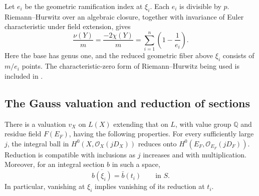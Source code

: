 Let $e_i$ be the geometric ramification index at $\xi_i$. Each $e_i$ is
divisible by $p$. Riemann--Hurwitz over an algebraic closure, together
with invariance of Euler characteristic under field extension, gives
\begin{equation}\label{eq:generic-hurwitz}
 \frac{\nu(Y)}m
 =\frac{-2\chi(Y)}m
 =\sum_{i=1}^n\left(1-\frac1{e_i}\right).
\end{equation}
Here the base has genus one, and the reduced geometric fiber above
$\xi_i$ consists of $m/e_i$ points. The characteristic-zero form of
Riemann--Hurwitz being used is included in .

\subsection{The Gauss valuation and reduction of sections}

\begin{lemma}\label{lem:gauss-section-rule}
There is a valuation $v_X$ on $L(X)$ extending that on $L$, with value
group $\mathbb Q$ and residue field $F(E_F)$, having the following
properties. For every sufficiently large $j$, the integral ball in
$H^0(X,\mathcal O_X(jD_X))$ reduces onto
$H^0(E_F,\mathcal O_{E_F}(jD_F))$. Reduction is compatible with inclusions
as $j$ increases and with multiplication. Moreover, for an integral
section $b$ in such a space,
\begin{equation}\label{eq:gauss-evaluation}
 \overline{b(\xi_i)}=\bar b(t_i)
 \qquad\text{in }S.
\end{equation}
In particular, vanishing at $\xi_i$ implies vanishing of its reduction
at $t_i$.
\end{lemma}

